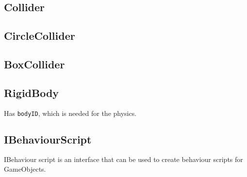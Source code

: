 \subsection{Collider}

\subsection{CircleCollider}

\subsection{BoxCollider}

\subsection{RigidBody}
Has \texttt{bodyID}, which is needed for the physics.

\subsection{IBehaviourScript}
IBehaviour script is an interface that can be used to create behaviour scripts for GameObjects.

